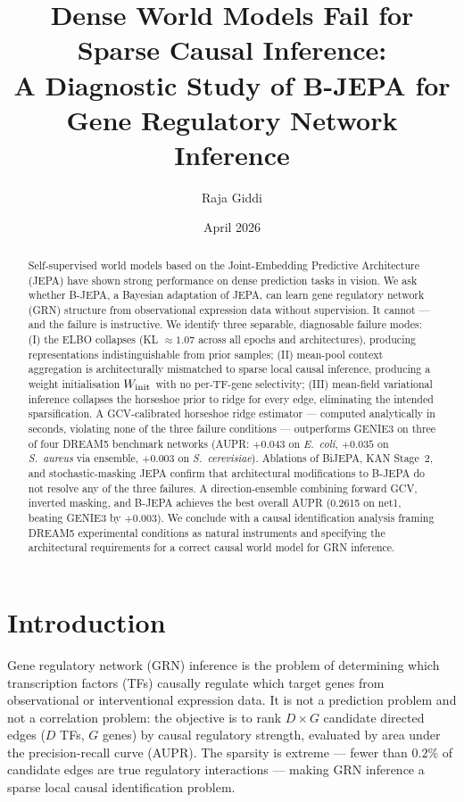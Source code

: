 \documentclass[11pt]{article}
\title{Dense World Models Fail for Sparse Causal Inference:\\
       A Diagnostic Study of B-JEPA for Gene Regulatory Network Inference}
\author{Raja Giddi}
\date{April 2026}
\begin{document}
\maketitle

\begin{abstract}
Self-supervised world models based on the Joint-Embedding Predictive Architecture
(JEPA) have shown strong performance on dense prediction tasks in vision.
We ask whether B-JEPA, a Bayesian adaptation of JEPA, can learn gene regulatory
network (GRN) structure from observational expression data without supervision.
It cannot --- and the failure is instructive.
We identify three separable, diagnosable failure modes:
(I) the ELBO collapses (KL $\approx 1.07$ across all epochs and architectures),
producing representations indistinguishable from prior samples;
(II) mean-pool context aggregation is architecturally mismatched to sparse local
causal inference, producing a weight initialisation $W_{\rm init}$ with no
per-TF-gene selectivity;
(III) mean-field variational inference collapses the horseshoe prior to ridge for
every edge, eliminating the intended sparsification.
A GCV-calibrated horseshoe ridge estimator --- computed analytically in seconds,
violating none of the three failure conditions --- outperforms GENIE3 on three of
four DREAM5 benchmark networks (AUPR: $+0.043$ on \textit{E.~coli},
$+0.035$ on \textit{S.~aureus} via ensemble, $+0.003$ on \textit{S.~cerevisiae}).
Ablations of BiJEPA, KAN Stage~2, and stochastic-masking JEPA confirm that
architectural modifications to B-JEPA do not resolve any of the three failures.
A direction-ensemble combining forward GCV, inverted masking, and B-JEPA achieves
the best overall AUPR (0.2615 on net1, beating GENIE3 by $+0.003$).
We conclude with a causal identification analysis framing DREAM5 experimental
conditions as natural instruments and specifying the architectural requirements
for a correct causal world model for GRN inference.
\end{abstract}

\section{Introduction}

Gene regulatory network (GRN) inference is the problem of determining which
transcription factors (TFs) causally regulate which target genes from
observational or interventional expression data.
It is not a prediction problem and not a correlation problem: the objective is
to rank $D \times G$ candidate directed edges ($D$ TFs, $G$ genes) by causal
regulatory strength, evaluated by area under the precision-recall curve (AUPR).
The sparsity is extreme --- fewer than $0.2\%$ of candidate edges are true
regulatory interactions --- making GRN inference a sparse local causal
identification problem.
\end{document}
